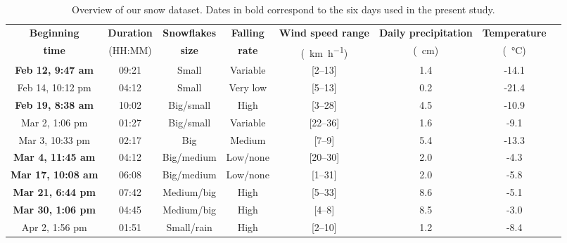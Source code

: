\begin{table}[htbp]
    \centering
    \begin{tabular}{|c|c|c|c|c|c|c|c|}
        \hline
        \textbf{Beginning} & \textbf{Duration} & \textbf{Snowflakes} & \textbf{Falling} & \textbf{Wind speed range} & \textbf{Daily precipitation}  & \textbf{Temperature} \\
        \textbf{time}      & (HH:MM)           & \textbf{size}       & \textbf{rate}    & (\SI{}{\km\per\hour})     & (\SI{}{\cm})                  & (\SI{}{\celsius})    \\\hline
       \textbf{Feb 12, 9:47 am}    &  09:21            & Small               & Variable         & [2--13]                   & 1.4                           & -14.1                \\\hline
        Feb 14, 10:12 pm   &  04:12            & Small               & Very low         & [5--13]                   & 0.2                           & -21.4                \\\hline
        \textbf{Feb 19, 8:38 am}    &  10:02            & Big/small           & High             & [3--28]                   & 4.5                           & -10.9                \\\hline
        Mar 2, 1:06 pm     &  01:27            & Big/small           & Variable         & [22--36]                  & 1.6                           & -9.1                 \\\hline
        Mar 3, 10:33 pm    &  02:17            & Big                 & Medium           & [7--9]                    & 5.4                           & -13.3                \\\hline
        \textbf{Mar 4, 11:45 am}    &  04:12            & Big/medium          & Low/none         & [20--30]                  & 2.0                           & -4.3                 \\\hline
        \textbf{Mar 17, 10:08 am}   &  06:08            & Big/medium          & Low/none         & [1--31]                   & 2.0                           & -5.8                 \\\hline
        \textbf{Mar 21, 6:44 pm}   &  07:42            & Medium/big          & High             & [5--33]                   & 8.6                           & -5.1                 \\\hline
        \textbf{Mar 30, 1:06 pm}    &  04:45            & Medium/big          & High             & [4--8]                    & 8.5                           & -3.0                 \\\hline
        Apr 2, 1:56 pm     &  01:51            & Small/rain          & High             & [2--10]                   & 1.2                           & -8.4                 \\\hline
    \end{tabular}
    \caption{Overview of our snow dataset. Dates in bold correspond to the six days used in the present study.}
    \label{tab:overview-dataset}
\end{table}

